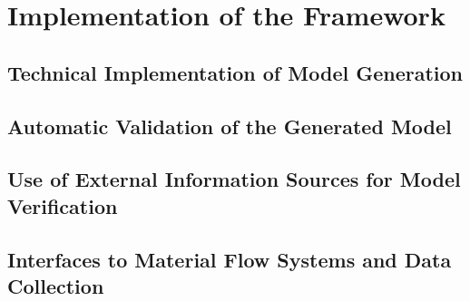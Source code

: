 \chapter{Implementation of the Framework}
\label{chap:implementation}

\section{Technical Implementation of Model Generation}
\section{Automatic Validation of the Generated Model}

\section{Use of External Information Sources for Model Verification}

\section{Interfaces to Material Flow Systems and Data Collection}
